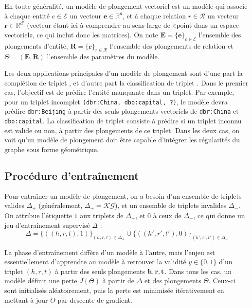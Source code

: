 En toute généralité, un modèle de plongement vectoriel est un modèle qui associe à chaque entité $e \in \mathcal{E}$ un vecteur $\mathbf{e} \in \mathbb{R}^d$, et à chaque relation $r \in \mathcal{R}$ un vecteur $\mathbf{r} \in \mathbb{R}^{d'}$ (vecteur étant ici à comprendre au sens large de «point dans un espace vectoriel», ce qui inclut donc les matrices). On note $\mathbf{E} = \{\mathbf{e}\}_{e \in \mathcal{E}} $ l'ensemble des plongements d'entité, $\mathbf{R} = \{\mathbf{r}\}_{r \in \mathcal{R}} $ l'ensemble des plongements de relation et $\Theta = (\mathbf{E}, \mathbf{R})$ l'ensemble des paramètres du modèle. 

Les deux applications principales d'un modèle de plongement sont d'une part la complétion de triplet \cite{simple2018}, et d'autre part la classification de triplet \cite{nguyen2020relational}. Dans le premier cas, l'objectif est de prédire l'entité manquante dans un triplet. Par exemple, pour un triplet incomplet \texttt{(dbr:China, dbo:capital, ?)}, le modèle devra prédire \texttt{dbr:Beijing} à partir des seuls plongements vectoriels de \texttt{dbr:China} et \texttt{dbo:capital}. La classification de triplet consiste à prédire si un triplet inconnu est valide ou non, à partir des plongements de ce triplet. Dans les deux cas, on voit qu'un modèle de plongement doit être capable d'intégrer les régularités du graphe sous forme géométrique.


\subsection{Procédure d'entraînement}
\label{subsec:kge-data}

Pour entraîner un modèle de plongement, on a besoin d'un ensemble de triplets valides $\Delta_+$ (généralement, $\Delta_+ = \mathcal{KG}$), et un ensemble de triplets invalides $\Delta_-$. %
On attribue l'étiquette $1$ aux triplets de $\Delta_+$, et $0$ à ceux de $\Delta_-$, ce qui donne un jeu d'entraînement supervisé $\Delta$ :
\begin{equation}
    \Delta = \{((h, r, t), 1)\}_{(h, r, t) \in \Delta_+} \cup
       \{((h', r', t'), 0)\}_{(h', r', t') \in \Delta_-}
       \label{eq:kge-training-set}
\end{equation}


La phase d'entraînement diffère d'un modèle à l'autre, mais l'enjeu est essentiellement d'apprendre au modèle à retrouver la validité $y \in \{ 0, 1\}$ d'un triplet $(h, r, t)$ à partir des seuls plongements $\bf{h, r, t}$. Dans tous les cas, un modèle définit une perte $J(\Theta)$ à partir de $\Delta$ et des plongements $\Theta$. Ceux-ci sont initialisés aléatoirement, puis la perte est minimisée itérativement en mettant à jour $\Theta$ par descente de gradient.


